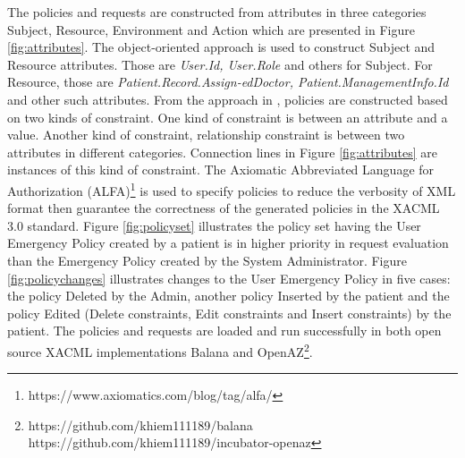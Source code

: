 The policies and requests are constructed from attributes in three categories Subject, Resource, Environment and Action which are presented in Figure \ref{fig:attributes}.
The object-oriented approach is used to construct Subject and Resource attributes.
Those are \textit{User.Id, User.Role} and others for Subject. 
For Resource, those are \textit{Patient.Record.Assign-edDoctor, Patient.ManagementInfo.Id} and other such attributes.
From the approach in \cite{medvet2015evolutionary}, policies are constructed based on two kinds of constraint.
One kind of constraint is between an attribute and a value.
Another kind of constraint, relationship constraint is between two attributes in different categories.
Connection lines in Figure \ref{fig:attributes} are instances of this kind of constraint.
The Axiomatic Abbreviated Language for Authorization (ALFA)\footnote{https://www.axiomatics.com/blog/tag/alfa/} is used to specify policies to reduce the verbosity of XML format then guarantee the correctness of the generated policies in the XACML 3.0 standard.
Figure \ref{fig:policyset} illustrates the policy set having the User Emergency Policy created by a patient is in higher priority in request evaluation than the Emergency Policy created by the System Administrator.
Figure \ref{fig:policychanges} illustrates changes to the User Emergency Policy in five cases: the policy Deleted by the Admin, another policy Inserted by the patient and the policy Edited (Delete constraints, Edit constraints and Insert constraints) by the patient.
The policies and requests are loaded and run successfully in both open source XACML implementations Balana and OpenAZ\footnote{https://github.com/khiem111189/balana\\https://github.com/khiem111189/incubator-openaz}.

